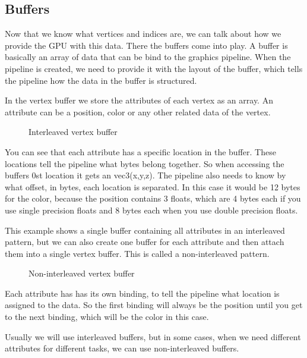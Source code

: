\documentclass[12pt]{report} \usepackage{preamble}
\begin{document}
\subsection{Buffers}

Now that we know what vertices and indices are, we can talk about how we
provide the \ac{GPU} with this data. There the buffers come into play. A buffer
is basically an array of data that can be bind to the graphics pipeline.
When the pipeline is created, we need to provide it with the layout of the
buffer, which tells the pipeline how the data in the buffer is structured.
\cite{vulkan-tutorial-vertex-buffer}

In the vertex buffer we store the attributes of each vertex as an
array. An attribute can be a position, color or any other related data
of the vertex. \cite{vulkan-tutorial-vertex-buffer}

\begin{figure}[hbtp]
	\centering 
	\caption{Interleaved vertex buffer}
\end{figure} \floatbarrier

You can see that each attribute has a specific location in the buffer.
These locations tell the pipeline what bytes belong together. So when
accessing the buffers 0st location it gets an vec3(x,y,z).  The pipeline
also needs to know by what offset, in bytes, each location is separated.
In this case it would be 12 bytes for the color, because the position
contains 3 floats, which are 4 bytes each if you use single precision
floats and 8 bytes each when you use double precision floats. \cite{vulkan-tutorial-vertex-buffer}

This example shows a single buffer containing all attributes in
an interleaved pattern, but we can also create one buffer for each
attribute and then attach them into a single vertex buffer. This is called
a non-interleaved pattern.

\begin{figure}[hbtp]
	
	\caption{Non-interleaved vertex buffer}
\end{figure} \floatbarrier

Each attribute has has its own binding, to tell the pipeline what location
is assigned to the data. So the first binding will always be the position
until you get to the next binding, which will be the color in this case.
\cite{vulkan-tutorial-vertex-buffer}

Usually we will use interleaved buffers, but in some cases, when we need
different attributes for different tasks, we can use non-interleaved
buffers.
\end{document}
